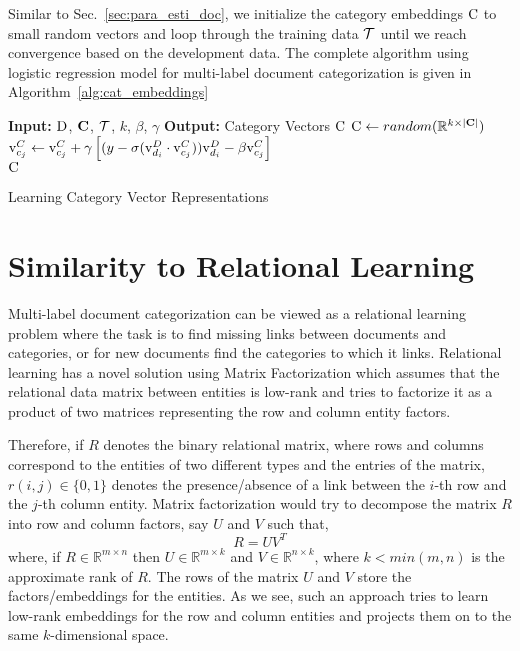 Similar to Sec.~\ref{sec:para_esti_doc}, we initialize the category embeddings $\mathrm{C}$ to small random vectors and loop through the training data $\mathcal{T}$ until we reach convergence based on the development data. The complete algorithm using logistic regression model for multi-label document categorization is given in Algorithm~\ref{alg:cat_embeddings}

\begin{algorithm}[h]
\begin{algorithmic}[1]
 \State \textbf{Input: } $\mathrm{D}$, $\mathbf{C}$, $\mathcal{T}$, $k$, $\beta$, $\gamma$
 \State \textbf{Output: } Category Vectors $\mathrm{C}$
 \State $\mathrm{C} \gets random(\mathbb{R}^{k \times |\mathbf{C}|})$
  \State $\mathrm{v}^{C}_{c_{j}} \gets \mathrm{v}^{C}_{c_{j}} + \gamma \left[ ( y - \sigma(\mathrm{v}^{D}_{d_{i}}\cdot \mathrm{v}^{C}_{c_{j}})) \mathrm{v}^{D}_{d_{i}} -\beta\mathrm{v}^{C}_{c_{j}} \right]$
 \EndFor 
 \EndWhile
 \\
 \Return $\mathrm{C}$
\end{algorithmic}
\caption{Learning Category Vector Representations}
\label{alg:cat_embeddings}
\end{algorithm}

\section{Similarity to Relational Learning}
\label{sec:lr_similar_rl}
Multi-label document categorization can be viewed as a relational learning problem where the task is to find missing links between documents and categories, or for new documents find the categories to which it links. Relational learning has a novel solution using Matrix Factorization which assumes that the relational data matrix between entities is low-rank and tries to factorize it as a product of two matrices representing the row and column entity factors. 

Therefore, if $R$ denotes the binary relational matrix, where rows and columns correspond to the entities of two different types and the entries of the matrix, $r(i, j) \in \{0,1\}$ denotes the presence/absence of a link between the $i$-th row and the $j$-th column entity. Matrix factorization would try to decompose the matrix $R$ into row and column factors, say $U$ and $V$ such that,
\begin{equation}
\label{eq:mf_decompose}
R = UV^{T}
\end{equation}
where, if $R \in \mathbb{R}^{m \times n}$ then $U \in \mathbb{R}^{m \times k}$ and $V \in \mathbb{R}^{n \times k}$, where $k < min(m, n)$ is the approximate rank of $R$. The rows of the matrix $U$ and $V$ store the factors/embeddings for the entities. As we see, such an approach tries to learn low-rank embeddings for the row and column entities and projects them on to the same $k$-dimensional space.

